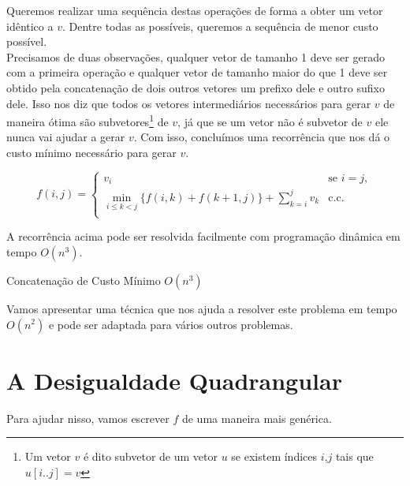 Queremos realizar uma sequência destas operações de forma a obter um vetor idêntico a $v$. Dentre todas as possíveis, queremos a sequência de menor custo possível. \\

Precisamos de duas observações, qualquer vetor de tamanho 1 deve ser gerado com a primeira operação e qualquer vetor de tamanho maior do que 1 deve ser obtido pela concatenação de dois outros vetores um prefixo dele e outro sufixo dele. Isso nos diz que todos os vetores intermediários necessários para gerar $v$ de maneira ótima são subvetores\footnote{Um vetor $v$ é dito subvetor de um vetor $u$ se existem índices $i$,$j$ tais que $u[i..j] = v$} de $v$, já que se um vetor não é subvetor de $v$ ele nunca vai ajudar a gerar $v$. Com isso, concluímos uma recorrência que nos dá o custo mínimo necessário para gerar $v$. 

$$
f(i,j) = \begin{cases}
    v_i & \text{se } i = j, \\
    \min\limits_{i \leq k < j} \Big\{ f(i,k) + f(k+1,j) \Big\} + \sum\limits_{k=i}^j v_k & \text{c.c.} \\
\end{cases}
$$

A recorrência acima pode ser resolvida facilmente com programação dinâmica em tempo $O(n^3)$.
\begin{algorithm}
\caption{Concatenação de Custo Mínimo $O(n^3)$}
\label{MinCostConcat}
\begin{algorithmic}[1]
\State \Return {}
\EndFunction
\end{algorithmic}
\end{algorithm}

Vamos apresentar uma técnica que nos ajuda a resolver este problema em tempo $O(n^2)$ e pode ser adaptada para vários outros problemas.


\section{A Desigualdade Quadrangular}
Para ajudar nisso, vamos escrever $f$ de uma maneira mais genérica.


